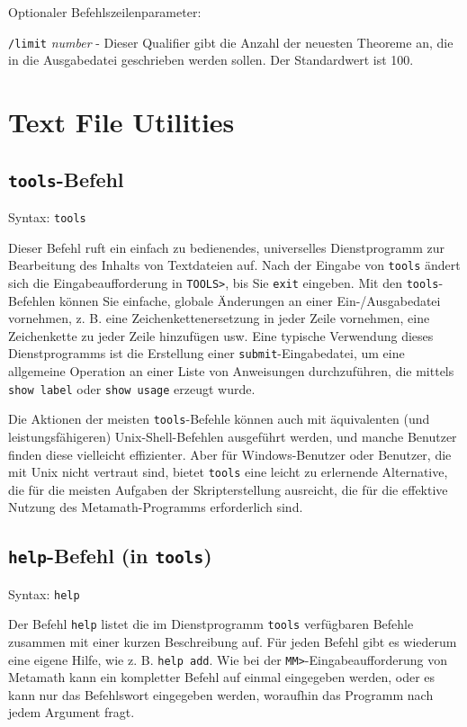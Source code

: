Optionaler Befehlszeilenparameter:

    \texttt{/limit} {\em number} - Dieser Qualifier gibt die Anzahl der neuesten Theoreme an, die in die Ausgabedatei geschrieben werden sollen.  Der Standardwert ist 100.


\section{Text File Utilities}

\subsection{\texttt{tools}-Befehl}

Syntax:  \texttt{tools}

Dieser Befehl ruft ein einfach zu bedienendes, universelles Dienstprogramm zur Bearbeitung des Inhalts von Textdateien auf.  Nach der Eingabe von \texttt{tools} ändert sich die Eingabeaufforderung in \texttt{TOOLS>}, bis Sie \texttt{exit} eingeben.  Mit den \texttt{tools}-Befehlen können Sie einfache, globale Änderungen an einer Ein-/Ausgabedatei vornehmen, z. B. eine Zeichenkettenersetzung in jeder Zeile vornehmen, eine Zeichenkette zu jeder Zeile hinzufügen usw.  Eine typische Verwendung dieses Dienstprogramms ist die Erstellung einer \texttt{submit}-Eingabedatei, um eine allgemeine Operation an einer Liste von Anweisungen durchzuführen, die mittels \texttt{show label} oder \texttt{show usage} erzeugt wurde. 

Die Aktionen der meisten \texttt{tools}-Befehle können auch mit äquivalenten (und leistungsfähigeren) Unix-Shell-Befehlen ausgeführt werden, und manche Benutzer finden diese vielleicht effizienter.  Aber für Windows-Benutzer oder Benutzer, die mit Unix nicht vertraut sind, bietet \texttt{tools} eine leicht zu erlernende Alternative, die für die meisten Aufgaben der Skripterstellung ausreicht, die für die effektive Nutzung des Metamath-Programms erforderlich sind. 


\subsection{\texttt{help}-Befehl (in \texttt{tools})}

Syntax:  \texttt{help}

Der Befehl \texttt{help} listet die im Dienstprogramm \texttt{tools} verfügbaren Befehle zusammen mit einer kurzen Beschreibung auf.  Für jeden Befehl gibt es wiederum eine eigene Hilfe, wie z. B. \texttt{help add}.  Wie bei der \texttt{MM>}-Eingabeaufforderung von Metamath kann ein kompletter Befehl auf einmal eingegeben werden, oder es kann nur das Befehlswort eingegeben werden, woraufhin das Programm nach jedem Argument fragt. 

